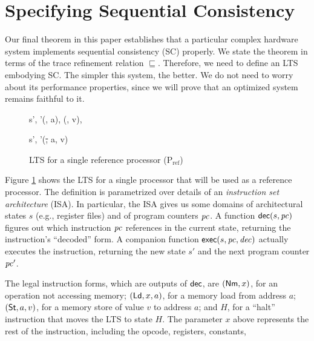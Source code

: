 \section{Specifying Sequential Consistency}\label{sec:sc}

Our final theorem in this paper establishes that a particular complex hardware
system implements sequential consistency (SC) properly.  We state the theorem
in terms of the trace refinement relation $\sqsubseteq$.
Therefore, we need to define an LTS embodying SC.  The simpler this
system, the better.  We do not need to worry about its performance properties,
since we will prove that an optimized system remains faithful to it.

\begin{figure}
\small
\centering
\begin{boxedminipage}[c]{.48\textwidth}
{}

{}

{
{s', \pc'}{(\ld\req, a), (\ld\resp, v), \Real}}

{
{s', \pc'}{(\st, a, v)}}
\end{boxedminipage}

\caption{LTS for a single reference processor (P$_{\text{ref}}$)}
\label{Pref$}
\end{figure}


Figure \ref{Pref$} shows the LTS for a single processor that will be used as a
reference processor.  The definition is parametrized over details of an
\emph{instruction set architecture} (ISA).  In particular, the ISA gives us
some domains of architectural states $s$ (e.g., register files) and of program
counters $\pc$.  A function $\dec(s, \pc)$ figures out which instruction $\pc$
references in the current state, returning the instruction's ``decoded'' form.
A companion function $\exec(s, \pc, \mathit{dec})$ actually executes the
instruction, returning the new state $s'$ and the next program counter $\pc'$.

The legal instruction forms, which are outputs of $\mathsf{dec}$, are $(\mathsf{Nm}, x)$, for
an operation not accessing memory; $(\mathsf{Ld}, x, a)$, for a memory load from
address $a$; $(\mathsf{St}, a, v)$, for a memory store of value $v$ to address $a$; and
$H$, for a ``halt'' instruction that moves the LTS to state $H$. The parameter
$x$ above represents the rest of the instruction, including the opcode,
registers, constants, \etc{}

